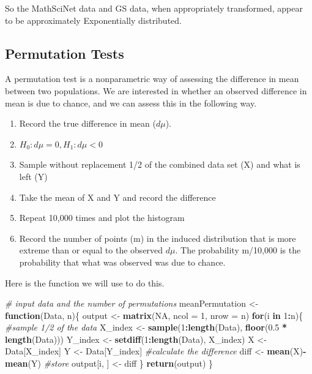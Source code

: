 \documentclass[]{article}
\newenvironment{Shaded}{\begin{snugshade}}{\end{snugshade}}
\newcommand{\CommentTok}[1]{\textcolor[rgb]{0.56,0.35,0.01}{\textit{#1}}}
\newcommand{\ControlFlowTok}[1]{\textcolor[rgb]{0.13,0.29,0.53}{\textbf{#1}}}
\newcommand{\DataTypeTok}[1]{\textcolor[rgb]{0.13,0.29,0.53}{#1}}
\newcommand{\DecValTok}[1]{\textcolor[rgb]{0.00,0.00,0.81}{#1}}
\newcommand{\FloatTok}[1]{\textcolor[rgb]{0.00,0.00,0.81}{#1}}
\newcommand{\KeywordTok}[1]{\textcolor[rgb]{0.13,0.29,0.53}{\textbf{#1}}}
\newcommand{\NormalTok}[1]{#1}
\newcommand{\OperatorTok}[1]{\textcolor[rgb]{0.81,0.36,0.00}{\textbf{#1}}}
\newcommand{\OtherTok}[1]{\textcolor[rgb]{0.56,0.35,0.01}{#1}}
\newcommand{\StringTok}[1]{\textcolor[rgb]{0.31,0.60,0.02}{#1}}
\providecommand{\tightlist}{%
  \setlength{\itemsep}{0pt}\setlength{\parskip}{0pt}}
\begin{document}
So the MathSciNet data and GS data, when appropriately transformed,
appear to be approximately Exponentially distributed.

\hypertarget{permutation-tests}{%
\subsection{Permutation Tests}\label{permutation-tests}}

A permutation test is a nonparametric way of assessing the difference in
mean between two populations. We are interested in whether an observed
difference in mean is due to chance, and we can assess this in the
following way.

\begin{enumerate}
\def\labelenumi{\arabic{enumi}.}
\setcounter{enumi}{-1}
\tightlist
\item
  Record the true difference in mean (\(d\mu\)).
\item
  \(H_0: d\mu = 0, H_1: d\mu < 0\)
\item
  Sample without replacement 1/2 of the combined data set (X) and what
  is left (Y)
\item
  Take the mean of X and Y and record the difference
\item
  Repeat 10,000 times and plot the histogram
\item
  Record the number of points (m) in the induced distribution that is
  more extreme than or equal to the observed \(d\mu\). The probability
  m/10,000 is the probability that what was observed was due to chance.
\end{enumerate}

Here is the function we will use to do this.

\begin{Shaded}
\begin{Highlighting}[]
\CommentTok{# input data and the number of permutations}
\NormalTok{meanPermutation <-}\StringTok{ }\ControlFlowTok{function}\NormalTok{(Data, n)\{}
\NormalTok{  output <-}\StringTok{ }\KeywordTok{matrix}\NormalTok{(}\OtherTok{NA}\NormalTok{, }\DataTypeTok{ncol =} \DecValTok{1}\NormalTok{, }\DataTypeTok{nrow =}\NormalTok{ n)}
  \ControlFlowTok{for}\NormalTok{(i }\ControlFlowTok{in} \DecValTok{1}\OperatorTok{:}\NormalTok{n)\{}
    \CommentTok{#sample 1/2 of the data}
\NormalTok{    X_index <-}\StringTok{ }\KeywordTok{sample}\NormalTok{(}\DecValTok{1}\OperatorTok{:}\KeywordTok{length}\NormalTok{(Data), }\KeywordTok{floor}\NormalTok{(}\FloatTok{0.5} \OperatorTok{*}\StringTok{ }\KeywordTok{length}\NormalTok{(Data)))}
\NormalTok{    Y_index <-}\StringTok{ }\KeywordTok{setdiff}\NormalTok{(}\DecValTok{1}\OperatorTok{:}\KeywordTok{length}\NormalTok{(Data), X_index)}
\NormalTok{    X <-}\StringTok{ }\NormalTok{Data[X_index]}
\NormalTok{    Y <-}\StringTok{ }\NormalTok{Data[Y_index]}
    \CommentTok{#calculate the difference}
\NormalTok{    diff <-}\StringTok{ }\KeywordTok{mean}\NormalTok{(X)}\OperatorTok{-}\KeywordTok{mean}\NormalTok{(Y)}
    \CommentTok{#store}
\NormalTok{    output[i, ] <-}\StringTok{ }\NormalTok{diff}
\NormalTok{  \} }
  \KeywordTok{return}\NormalTok{(output)}
\NormalTok{\}}
\end{Highlighting}
\end{Shaded}
\end{document}
